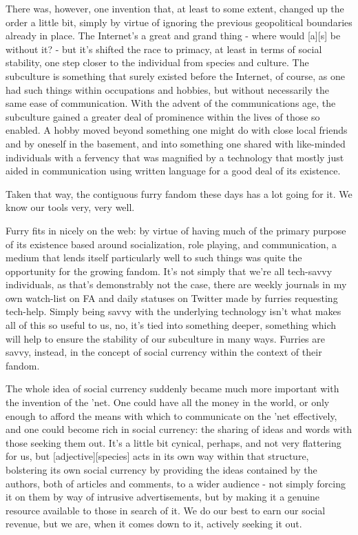 There was, however, one invention that, at least to some extent, changed up the order a little bit, simply by virtue of ignoring the previous geopolitical boundaries already in place. The Internet's a great and grand thing - where would {[}a{]}{[}s{]} be without it? - but it's shifted the race to primacy, at least in terms of social stability, one step closer to the individual from species and culture. The subculture is something that surely existed before the Internet, of course, as one had such things within occupations and hobbies, but without necessarily the same ease of communication. With the advent of the communications age, the subculture gained a greater deal of prominence within the lives of those so enabled. A hobby moved beyond something one might do with close local friends and by oneself in the basement, and into something one shared with like-minded individuals with a fervency that was magnified by a technology that mostly just aided in communication using written language for a good deal of its existence.

Taken that way, the contiguous furry fandom these days has a lot going for it. We know our tools very, very well.

Furry fits in nicely on the web: by virtue of having much of the primary purpose of its existence based around socialization, role playing, and communication, a medium that lends itself particularly well to such things was quite the opportunity for the growing fandom. It's not simply that we're all tech-savvy individuals, as that's demonstrably not the case, there are weekly journals in my own watch-list on FA and daily statuses on Twitter made by furries requesting tech-help. Simply being savvy with the underlying technology isn't what makes all of this so useful to us, no, it's tied into something deeper, something which will help to ensure the stability of our subculture in many ways. Furries are savvy, instead, in the concept of social currency within the context of their fandom.

The whole idea of social currency suddenly became much more important with the invention of the 'net. One could have all the money in the world, or only enough to afford the means with which to communicate on the 'net effectively, and one could become rich in social currency: the sharing of ideas and words with those seeking them out. It's a little bit cynical, perhaps, and not very flattering for us, but {[}adjective{]}{[}species{]} acts in its own way within that structure, bolstering its own social currency by providing the ideas contained by the authors, both of articles and comments, to a wider audience - not simply forcing it on them by way of intrusive advertisements, but by making it a genuine resource available to those in search of it. We do our best to earn our social revenue, but we are, when it comes down to it, actively seeking it out.

